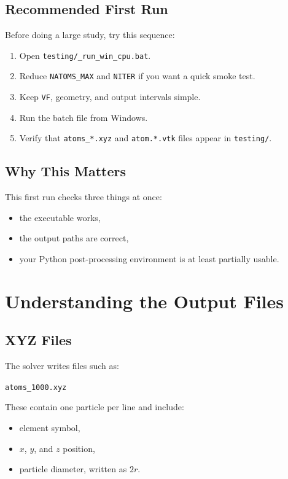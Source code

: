 \documentclass[11pt]{article}
\begin{document}
\subsection{Recommended First Run}

Before doing a large study, try this sequence:
\begin{enumerate}
  \item Open \texttt{testing/\_run\_win\_cpu.bat}.
  \item Reduce \texttt{NATOMS\_MAX} and \texttt{NITER} if you want a quick smoke test.
  \item Keep \texttt{VF}, geometry, and output intervals simple.
  \item Run the batch file from Windows.
  \item Verify that \texttt{atoms\_*.xyz} and \texttt{atom.*.vtk} files appear in \texttt{testing/}.
\end{enumerate}

\subsection{Why This Matters}

This first run checks three things at once:
\begin{itemize}
  \item the executable works,
  \item the output paths are correct,
  \item your Python post-processing environment is at least partially usable.
\end{itemize}

\section{Understanding the Output Files}

\subsection{XYZ Files}

The solver writes files such as:
\begin{center}
\texttt{atoms\_1000.xyz}
\end{center}

These contain one particle per line and include:
\begin{itemize}
  \item element symbol,
  \item \(x\), \(y\), and \(z\) position,
  \item particle diameter, written as \(2r\).
\end{itemize}
\end{document}
